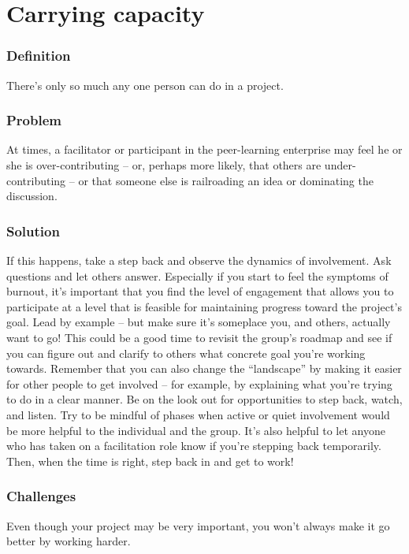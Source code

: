 \section{Carrying capacity}\label{sec:Carrying_capacity}
\subsubsection*{Definition} There's only so much any one person can do in a
project.

\subsubsection*{Problem} At times, a facilitator or participant in the
peer-learning enterprise may feel he or she is over-contributing -- or,
perhaps more likely, that others are under-contributing -- or that
someone else is railroading an idea or dominating the discussion.

\subsubsection*{Solution} If this happens, take a step back and observe the
dynamics of involvement. Ask questions and let others answer. Especially
if you start to feel the symptoms of burnout, it's important that you
find the level of engagement that allows you to participate at a level
that is feasible for maintaining progress toward the project's goal.
Lead by example -- but make sure it's someplace you, and others,
actually want to go! This could be a good time to revisit the group's
roadmap and see if you can figure out and clarify to others what
concrete goal you're working towards. Remember that you can also change
the ``landscape'' by making it easier for other people to get involved
-- for example, by explaining what you're trying to do in a clear
manner. Be on the look out for opportunities to step back, watch, and
listen. Try to be mindful of phases when active or quiet involvement
would be more helpful to the individual and the group. It's also helpful
to let anyone who has taken on a facilitation role know if you're
stepping back temporarily. Then, when the time is right, step back in
and get to work!

\subsubsection*{Challenges} Even though your project may be very important, you
won't always make it go better by working harder.

